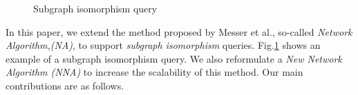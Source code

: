 



\begin{figure}
\centering

\caption{Subgraph isomorphism query}
\label{fig:fig11}
\end{figure}



In this paper, we extend the method proposed by Messer et al.\cite{messmer_bunke2000}, so-called \textit{Network Algorithm,(NA)}, to support \textit{subgraph isomorphism} queries.
Fig.\ref{fig:fig11} shows an example of a subgraph isomorphism query. We also reformulate a  \textit{New Network Algorithm (NNA)} to increase the scalability of this method.
Our main contributions are as follows.

